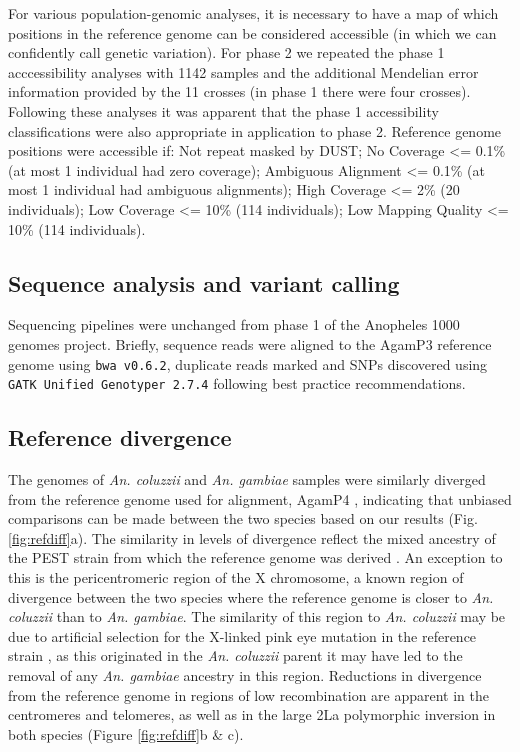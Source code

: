 \documentclass[a4paper,11pt,abstracton,hidelinks]{scrartcl}
\begin{document}
%
For various population-genomic analyses, it is necessary to have a map of which positions in the reference genome can be considered accessible (in which we can confidently call genetic variation).
%
For phase 2 we repeated the phase 1 acccessibility analyses \cite{Ag1000G2017} with 1142 samples and the additional Mendelian error information provided by the 11 crosses (in phase 1 there were four crosses).
%
Following these analyses it was apparent that the phase 1 accessibility classifications were also appropriate in application to phase 2.
%
Reference genome positions were accessible if: 
Not repeat masked by DUST; 
No Coverage <= 0.1\% (at most 1 individual had zero coverage); 
Ambiguous Alignment <= 0.1\% (at most 1 individual had ambiguous alignments); 
High Coverage <= 2\% (20 individuals); 
Low Coverage <= 10\% (114 individuals); 
Low Mapping Quality <= 10\% (114 individuals).


\subsection*{Sequence analysis and variant calling}


Sequencing pipelines were unchanged from phase 1 of the Anopheles 1000 genomes project\cite{Ag1000G2017}.
%
Briefly, sequence reads were aligned to the AgamP3 reference genome \cite{sharakhova2007update} using \texttt{bwa v0.6.2}, duplicate reads marked \cite{li2009} and SNPs discovered using \texttt{GATK Unified Genotyper 2.7.4} \cite{van2013} following best practice recommendations. 


\subsection*{Reference divergence}

The genomes of \textit{An. coluzzii} and \textit{An. gambiae} samples were similarly diverged from the reference genome used for alignment, AgamP4 \cite{Holt2002}, indicating that unbiased comparisons can be made between the two species based on our results (Fig. \ref{fig:refdiff}a).
%
The similarity in levels of divergence reflect the mixed ancestry of the PEST strain from which the reference genome was derived \cite{Holt2002}.
%
An exception to this is the pericentromeric region of the X chromosome, a known region of divergence between the two species \cite{Ag1000G2017} where the reference genome is closer to \textit{An. coluzzii} than to \textit{An. gambiae}.
%
The similarity of this region to \textit{An. coluzzii} may be due to artificial selection for the X-linked pink eye mutation in the reference strain \cite{Holt2002}, as this originated in the \textit{An. coluzzii} parent it may have led to the removal of any \textit{An. gambiae} ancestry in this region.
%
Reductions in divergence from the reference genome in regions of low recombination are apparent in the centromeres and telomeres, as well as in the large 2La polymorphic inversion in both species \cite{coluzzi2002} (Figure \ref{fig:refdiff}b \& c). 
\end{document}
